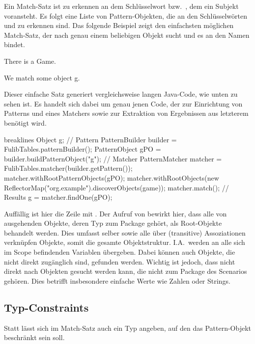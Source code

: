 Ein Match-Satz ist zu erkennen an dem Schlüsselwort  bzw.\ , dem ein Subjekt voransteht.
Es folgt eine Liste von Pattern-Objekten, die an den Schlüsselwörten  und  zu erkennen sind.
Das folgende Beispiel zeigt den einfachsten möglichen Match-Satz, der nach genau einem beliebigen Objekt sucht und es an den Namen  bindet.

\begin{mdcodeblock}
    There is a Game.

    We match some object g.
\end{mdcodeblock}

Dieser einfache Satz generiert vergleichsweise langen Java-Code, wie unten zu sehen ist.
Es handelt sich dabei um genau jenen Code, der zur Einrichtung von Patterns und eines Matchers sowie zur Extraktion von Ergebnissen aus letzterem benötigt wird.

\begin{jcodeblock*}{breaklines}
    Object g;
    {
        // Pattern
        PatternBuilder builder = FulibTables.patternBuilder();
        PatternObject gPO = builder.buildPatternObject("g");
        // Matcher
        PatternMatcher matcher = FulibTables.matcher(builder.getPattern());
        matcher.withRootPatternObjects(gPO);
        matcher.withRootObjects(new ReflectorMap("org.example").discoverObjects(game));
        matcher.match();
        // Results
        g = matcher.findOne(gPO);
    }
\end{jcodeblock*}

Auffällig ist hier die Zeile mit .
Der Aufruf von  bewirkt hier, dass alle von  ausgehenden Objekte, deren Typ zum Package  gehört, als Root-Objekte behandelt werden.
Dies umfasst  selber sowie alle über (transitive) Assoziationen verknüpfen Objekte,
somit die gesamte Objektstruktur.
I.A.\ werden an  alle sich im Scope befindenden Variablen übergeben.
Dabei können auch Objekte, die nicht direkt zugänglich sind, gefunden werden.
Wichtig ist jedoch, dass nicht direkt nach Objekten gesucht werden kann, die nicht zum Package des Scenarios gehören.
Dies betrifft insbesondere einfache Werte wie Zahlen oder Strings.

\subsection{Typ-Constraints}

Statt  lässt sich im Match-Satz auch ein Typ angeben, auf den das Pattern-Objekt beschränkt sein soll.

